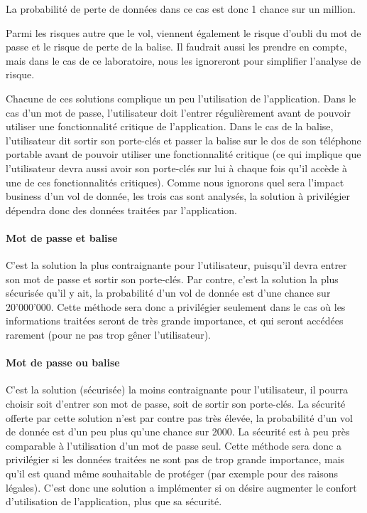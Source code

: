 \documentclass[a4paper,11pt,titlepage]{article}
\begin{document}
La probabilité de perte de données dans ce cas est donc 1 chance sur un million.


Parmi les risques autre que le vol, viennent également le risque d'oubli du mot de passe et le risque de perte
de la balise. Il faudrait aussi les prendre en compte, mais dans le cas de ce laboratoire, nous les ignoreront
pour simplifier l'analyse de risque.

Chacune de ces solutions complique un peu l'utilisation de l'application. Dans le cas d'un mot de passe,
l'utilisateur doit l'entrer régulièrement avant de pouvoir utiliser une fonctionnalité critique de
l'application. Dans le cas de la balise, l'utilisateur dit sortir son porte-clés et passer la balise sur le dos
de son téléphone portable avant de pouvoir utiliser une fonctionnalité critique (ce qui implique que
l'utilisateur devra aussi avoir son porte-clés sur lui à chaque fois qu'il accède à une de ces fonctionnalités
critiques). Comme nous ignorons quel sera l'impact business d'un vol de donnée, les trois cas sont analysés, la
solution à privilégier dépendra donc des données traitées par l'application.

\paragraph{Mot de passe et balise}
C'est la solution la plus contraignante pour l'utilisateur, puisqu'il devra entrer son mot de passe et sortir
son porte-clés. Par contre, c'est la solution la plus sécurisée qu'il y ait, la probabilité d'un vol de donnée
est d'une chance sur 20'000'000. Cette méthode sera donc a privilégier seulement dans le cas où les informations
traitées seront de très grande importance, et qui seront accédées rarement (pour ne pas trop gêner l'utilisateur).

\paragraph{Mot de passe ou balise}
C'est la solution (sécurisée) la moins contraignante pour l'utilisateur, il pourra choisir soit d'entrer son
mot de passe, soit de sortir son porte-clés. La sécurité offerte par cette solution n'est par contre pas très
élevée, la probabilité d'un vol de donnée est d'un peu plus qu'une chance sur 2000. La sécurité est à peu près
comparable à l'utilisation d'un mot de passe seul. Cette méthode sera donc a privilégier si les données traitées
ne sont pas de trop grande importance, mais qu'il est quand même souhaitable de protéger (par exemple pour des
raisons légales). C'est donc une solution a implémenter si on désire augmenter le confort d'utilisation de
l'application, plus que sa sécurité.
\end{document}
